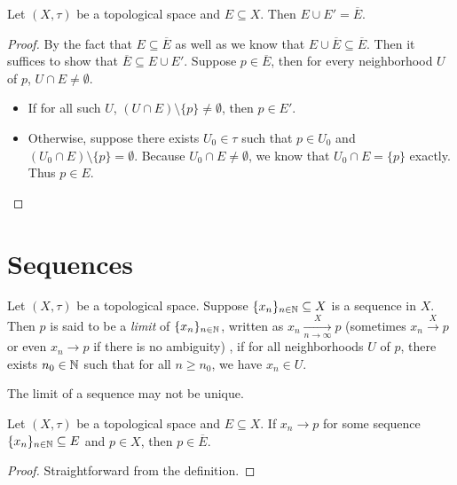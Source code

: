 \documentclass{techreport}
\begin{document}
\begin{proposition}\label{Prop:OrigPlusLimitIsClosure}
	Let $(X,\tau)$ be a topological space and $E \subseteq X$.
	Then $E \cup E' = \overline{E}$.
\end{proposition}
\begin{proof}
	By the fact that $E \subseteq \overline{E}$ as well as  we know that $E \cup \overline{E} \subseteq \overline{E}$.
	Then it suffices to show that $\overline{E} \subseteq E \cup E'$.
	Suppose $p \in \overline{E}$, then for every neighborhood $U$ of $p$, $U \cap E \neq \emptyset$.
	\begin{itemize}
		\item If for all such $U$, $(U \cap E) \setminus \{p\} \neq \emptyset$, then $p \in E'$.
		\item Otherwise, suppose there exists $U_0 \in \tau$ such that $p \in U_0$ and $(U_0 \cap E) \setminus \{p\} = \emptyset$. Because $U_0 \cap E \neq \emptyset$, we know that $U_0 \cap E = \{ p\}$ exactly. Thus $p \in E$.
	\end{itemize}
\end{proof}

\section{Sequences}

\begin{definition}\label{De:Sequences}
	Let $(X,\tau)$ be a topological space.
	Suppose $\{x_n\}_{n \in \mathbb{N}} \subseteq X$ is a sequence in $X$.
	Then $p$ is said to be a \emph{limit} of $\{x_n\}_{n \in \mathbb{N}}$, written as $x_n \xrightarrow[n \to \infty]{X} p$ (sometimes $x_n \xrightarrow{X} p$ or even $x_n \rightarrow p$ if there is no ambiguity) , if for all neighborhoods $U$ of $p$, there exists $n_0 \in \mathbb{N}$ such that for all $n \ge n_0$, we have $x_n \in U$.
\end{definition}

\begin{remark}\label{Rem:LimitOfSeqNotUnique}
	The limit of a sequence may not be unique.
\end{remark}

\begin{lemma}\label{Lem:LimitOfSeqInClosure}
	Let $(X,\tau)$ be a topological space and $E \subseteq X$.
	If $x_n \rightarrow p$ for some sequence $\{x_n\}_{n \in \mathbb{N}} \subseteq E$ and $p \in X$, then $p \in \overline{E}$.
\end{lemma}
\begin{proof}
	Straightforward from the definition.
\end{proof}
\end{document}

